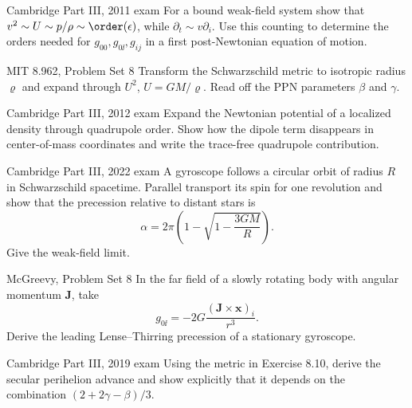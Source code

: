 \begin{exercises}

\begin{exercise}{Cambridge Part III, 2011 exam}
For a bound weak-field system show that
\(v^2\sim U\sim p/\rho\sim\order(\epsilon)\), while
\(\partial_t\sim v\partial_i\).  Use this counting to determine the orders
needed for \(g_{00},g_{0\ii},g_{ij}\) in a first post-Newtonian equation of
motion.
\end{exercise}

\begin{exercise}{MIT 8.962, Problem Set 8}
Transform the Schwarzschild metric to isotropic radius \(\varrho\) and expand
through \(U^2\), \(U=GM/\varrho\).  Read off the PPN parameters \(\beta\) and
\(\gamma\).
\end{exercise}

\begin{exercise}{Cambridge Part III, 2012 exam}
Expand the Newtonian potential of a localized density through quadrupole
order.  Show how the dipole term disappears in center-of-mass coordinates and
write the trace-free quadrupole contribution.
\end{exercise}

\begin{exercise}{Cambridge Part III, 2022 exam}
A gyroscope follows a circular orbit of radius \(R\) in Schwarzschild
spacetime.  Parallel transport its spin for one revolution and show that the
precession relative to distant stars is
\[
\alpha=2\pi\left(1-\sqrt{1-\frac{3GM}{R}}\right).
\]
Give the weak-field limit.
\end{exercise}

\begin{exercise}{McGreevy, Problem Set 8}
In the far field of a slowly rotating body with angular momentum \(\bm J\),
take
\[
g_{0\ii}=-2G\frac{(\bm J\times\bm x)_i}{r^3}.
\]
Derive the leading Lense--Thirring precession of a stationary gyroscope.
\end{exercise}

\begin{exercise}{Cambridge Part III, 2019 exam}
Using the metric in Exercise 8.10, derive the secular perihelion advance and
show explicitly that it depends on the combination
\((2+2\gamma-\beta)/3\).
\end{exercise}


\end{exercises}
